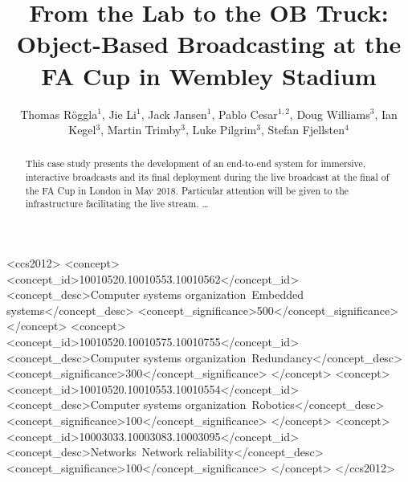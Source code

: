 \documentclass[sigchi-a, authorversion]{acmart}
\begin{document}
\title{From the Lab to the OB Truck: Object-Based Broadcasting at the FA Cup in Wembley Stadium}

\author{Thomas R\"{o}ggla$^1$, Jie Li$^1$, Jack Jansen$^1$, Pablo Cesar$^{1,2}$, Doug Williams$^3$, Ian Kegel$^3$, Martin Trimby$^3$, Luke Pilgrim$^3$, Stefan Fjellsten$^4$}


\renewcommand{\shortauthors}{T. R\"{o}ggla et al.}


%
%
\begin{CCSXML}
<ccs2012>
 <concept>
  <concept_id>10010520.10010553.10010562</concept_id>
  <concept_desc>Computer systems organization~Embedded systems</concept_desc>
  <concept_significance>500</concept_significance>
 </concept>
 <concept>
  <concept_id>10010520.10010575.10010755</concept_id>
  <concept_desc>Computer systems organization~Redundancy</concept_desc>
  <concept_significance>300</concept_significance>
 </concept>
 <concept>
  <concept_id>10010520.10010553.10010554</concept_id>
  <concept_desc>Computer systems organization~Robotics</concept_desc>
  <concept_significance>100</concept_significance>
 </concept>
 <concept>
  <concept_id>10003033.10003083.10003095</concept_id>
  <concept_desc>Networks~Network reliability</concept_desc>
  <concept_significance>100</concept_significance>
 </concept>
</ccs2012>
\end{CCSXML}



\begin{abstract}
This case study presents the development of an end-to-end system for
immersive, interactive broadcasts and its final deployment during the live
broadcast at the final of the FA Cup in London in May 2018. Particular attention
will be given to the infrastructure facilitating the live stream.
\ldots
\end{abstract}
\end{document}
